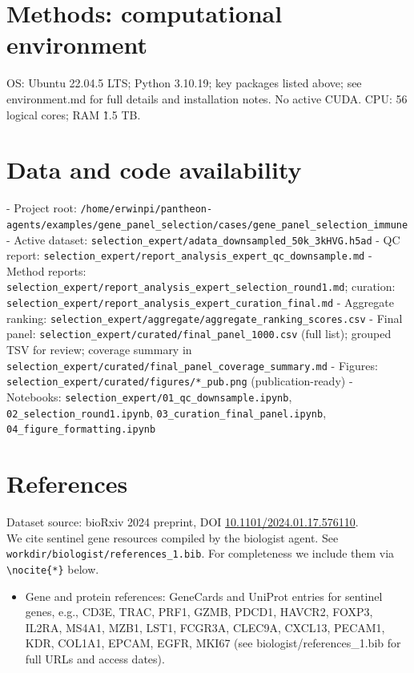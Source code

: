 \documentclass[11pt]{article}
\begin{document}
\section{Methods: computational environment}
OS: Ubuntu 22.04.5 LTS; Python 3.10.19; key packages listed above; see environment.md for full details and installation notes. No active CUDA. CPU: 56 logical cores; RAM \~1.5 TB.

\section{Data and code availability}
- Project root: \texttt{/home/erwinpi/pantheon-agents/examples/gene_panel_selection/cases/gene_panel_selection_immune}
- Active dataset: \texttt{selection\_expert/adata\_downsampled\_50k\_3kHVG.h5ad}
- QC report: \texttt{selection\_expert/report\_analysis\_expert\_qc\_downsample.md}
- Method reports: \texttt{selection\_expert/report\_analysis\_expert\_selection\_round1.md}; curation: \texttt{selection\_expert/report\_analysis\_expert\_curation\_final.md}
- Aggregate ranking: \texttt{selection\_expert/aggregate/aggregate\_ranking\_scores.csv}
- Final panel: \texttt{selection\_expert/curated/final\_panel\_1000.csv} (full list); grouped TSV for review; coverage summary in \texttt{selection\_expert/curated/final\_panel_coverage\_summary.md}
- Figures: \texttt{selection\_expert/curated/figures/*\_pub.png} (publication-ready)
- Notebooks: \texttt{selection\_expert/01\_qc\_downsample.ipynb}, \texttt{02\_selection\_round1.ipynb}, \texttt{03\_curation\_final\_panel.ipynb}, \texttt{04\_figure\_formatting.ipynb}

\section{References}
Dataset source: bioRxiv 2024 preprint, DOI \href{https://doi.org/10.1101/2024.01.17.576110}{10.1101/2024.01.17.576110}.
\\
We cite sentinel gene resources compiled by the biologist agent. See \texttt{workdir/biologist/references\_1.bib}. For completeness we include them via \verb+\nocite{*}+ below.

\nocite{*}
\begingroup
\small
\begin{itemize}
\item Gene and protein references: GeneCards and UniProt entries for sentinel genes, e.g., CD3E, TRAC, PRF1, GZMB, PDCD1, HAVCR2, FOXP3, IL2RA, MS4A1, MZB1, LST1, FCGR3A, CLEC9A, CXCL13, PECAM1, KDR, COL1A1, EPCAM, EGFR, MKI67 (see biologist/references\_1.bib for full URLs and access dates).
\end{itemize}
\endgroup
\end{document}
